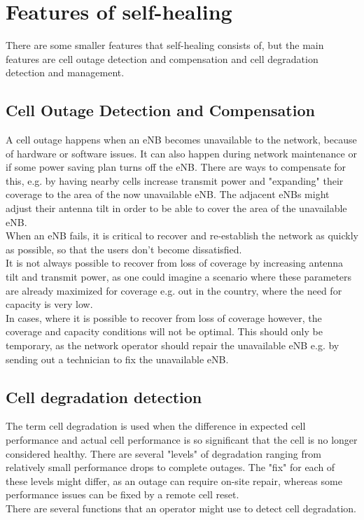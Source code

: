 \documentclass{report}
\begin{document}
\section{Features of self-healing}
There are some smaller features that self-healing consists of, but the main features are cell outage detection and compensation and cell degradation detection and management. 

\subsection{Cell Outage Detection and Compensation}
A cell outage happens when an eNB becomes unavailable to the network, because of hardware or software issues. It can also happen during network maintenance or if some power saving plan turns off the eNB. There are ways to compensate for this, e.g. by having nearby cells increase transmit power and "expanding" their coverage to the area of the now unavailable eNB. The adjacent eNBs might adjust their antenna tilt in order to be able to cover the area of the unavailable eNB. \\ When an eNB fails, it is critical to recover and re-establish the network as quickly as possible, so that the users don't become dissatisfied. \\ It is not always possible to recover from loss of coverage by increasing antenna tilt and transmit power, as one could imagine a scenario where these parameters are already maximized for coverage e.g. out in the country, where the need for capacity is very low. \\ In cases, where it is possible to recover from loss of coverage however, the coverage and capacity conditions will not be optimal. This should only be temporary, as the network operator should repair the unavailable eNB e.g. by sending out a technician to fix the unavailable eNB. \cite{Sartori2012}

\subsection{Cell degradation detection}
The term cell degradation is used when the difference in expected cell performance and actual cell performance is so significant that the cell is no longer considered healthy. There are several "levels" of degradation ranging from relatively small performance drops to complete outages. The "fix" for each of these levels might differ, as an outage can require on-site repair, whereas some performance issues can be fixed by a remote cell reset. \\
There are several functions that an operator might use to detect cell degradation. 
\end{document}
